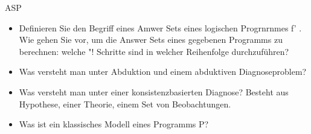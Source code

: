 \documentclass[a4paper,oneside,10pt,DIV12,headsepline,footexclude,headexclude]{scrartcl}
\begin{document}
    \begin{section}{ASP}
        \begin{itemize}
            \item Definieren Sie den Begriff eines Amwer Sets eines logischen Progrnrnmes f' .
Wie gehen Sie vor, um die Answer Sets eines gegebenen Programms zu berechnen: welche "!
Schritte sind in welcher Reihenfolge durchzuführen?  
            \item Was versteht man unter Abduktion und einem abduktiven Diagnoseproblem?  
            \item Was versteht man unter einer konsistenzbasierten Diagnose?
            Besteht aus Hypothese, einer Theorie, einem Set von Beobachtungen.
            \item Was ist ein klassisches Modell eines Programms P?
        \end{itemize}

\end{section}
\end{document}
